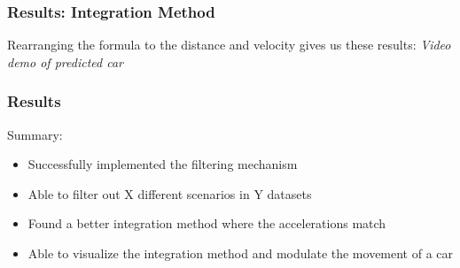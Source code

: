 \begin{frame}
\begin{figure}
\begin{minipage}[b]{0.49\linewidth}
    \end{minipage}
  \end{figure}
\end{frame}






\begin{frame}
  \frametitle{Results: Integration Method}
    Rearranging the formula to the distance and velocity gives us these results:
    \center \textit{Video demo of predicted car}
\end{frame}


\begin{frame}
  \frametitle{Results}
    Summary:
    \begin{itemize}[<+->]
      \item Successfully implemented the filtering mechanism
      \item Able to filter out X different scenarios in Y datasets
      \item Found a better integration method where the accelerations match
      \item Able to visualize the integration method and modulate the movement of a car
    \end{itemize}
\end{frame}

